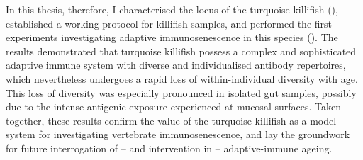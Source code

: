 In this thesis, therefore, I characterised the \igh{} locus of the turquoise killifish (), established a working \Igseq protocol for killifish samples, and performed the first experiments investigating adaptive immunosenescence in this species (). The results demonstrated that turquoise killifish possess a complex and sophisticated adaptive immune system with diverse and individualised antibody repertoires, which nevertheless undergoes a rapid loss of within-individual diversity with age. This loss of diversity was especially pronounced in isolated gut samples, possibly due to the intense antigenic exposure experienced at mucosal surfaces. Taken together, these results confirm the value of the turquoise killifish as a model system for investigating vertebrate immunosenescence, and lay the groundwork for future interrogation of -- and intervention in -- adaptive-immune ageing.


